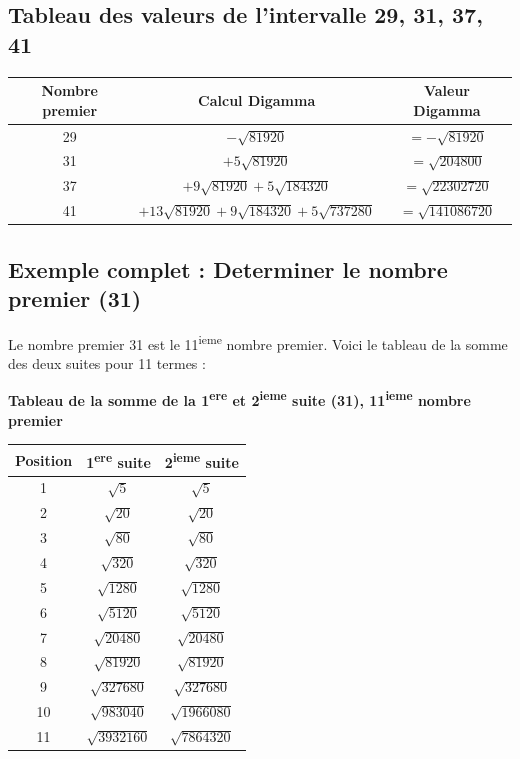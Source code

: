 \documentclass[a4paper,11pt]{article}
\begin{document}
\subsection{Tableau des valeurs de l'intervalle 29, 31, 37, 41}

\begin{center}
\begin{tabular}{|c|c|c|}
\hline
\textbf{Nombre premier} & \textbf{Calcul Digamma} & \textbf{Valeur Digamma} \\
\hline
29 & $-\sqrt{81920}$ & $= -\sqrt{81920}$ \\
\hline
31 & $+5\sqrt{81920}$ & $= \sqrt{204800}$ \\
\hline
37 & $+9\sqrt{81920} + 5\sqrt{184320}$ & $= \sqrt{22302720}$ \\
\hline
41 & $+13\sqrt{81920} + 9\sqrt{184320} + 5\sqrt{737280}$ & $= \sqrt{141086720}$ \\
\hline
\end{tabular}
\end{center}

\subsection{Exemple complet : Determiner le nombre premier (31)}

Le nombre premier 31 est le 11\textsuperscript{ieme} nombre premier. Voici le tableau de la somme des deux suites pour 11 termes :

\begin{center}
\textbf{Tableau de la somme de la 1\textsuperscript{ere} et 2\textsuperscript{ieme} suite (31), 11\textsuperscript{ieme} nombre premier}
\end{center}

\begin{center}
\small
\begin{tabular}{|c|c|c|}
\hline
\textbf{Position} & \textbf{1\textsuperscript{ere} suite} & \textbf{2\textsuperscript{ieme} suite} \\
\hline
1 & $\sqrt{5}$ & $\sqrt{5}$ \\
\hline
2 & $\sqrt{20}$ & $\sqrt{20}$ \\
\hline
3 & $\sqrt{80}$ & $\sqrt{80}$ \\
\hline
4 & $\sqrt{320}$ & $\sqrt{320}$ \\
\hline
5 & $\sqrt{1280}$ & $\sqrt{1280}$ \\
\hline
6 & $\sqrt{5120}$ & $\sqrt{5120}$ \\
\hline
7 & $\sqrt{20480}$ & $\sqrt{20480}$ \\
\hline
8 & $\sqrt{81920}$ & $\sqrt{81920}$ \\
\hline
9 & $\sqrt{327680}$ & $\sqrt{327680}$ \\
\hline
10 & $\sqrt{983040}$ & $\sqrt{1966080}$ \\
\hline
11 & $\sqrt{3932160}$ & $\sqrt{7864320}$ \\
\hline
\end{tabular}
\end{center}
\end{document}
